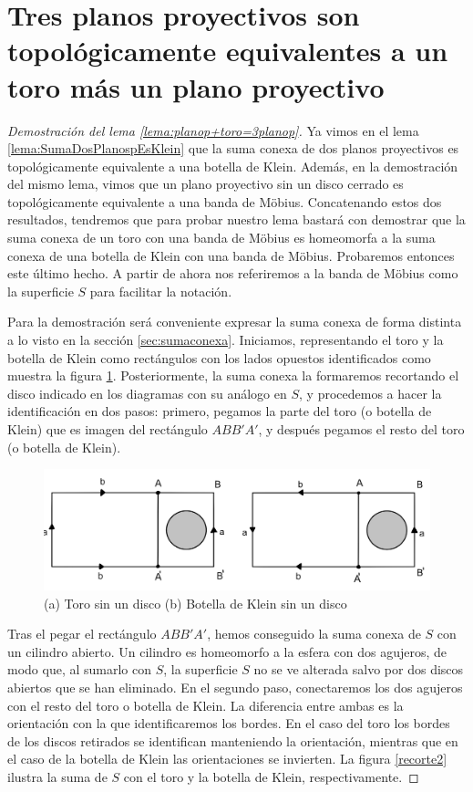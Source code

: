 \documentclass[a4paper,11pt,spanish, twoside, leqno]{tfg-uam}
\theoremstyle{definition}
\begin{document}
\section{Tres planos proyectivos son topológicamente equivalentes a un toro más un plano proyectivo}
\label{anexo:lema1}
\begin{proof}[Demostración del lema \ref{lema:planop+toro=3planop}]


Ya vimos en  el lema \ref{lema:SumaDosPlanospEsKlein} que la suma conexa de dos planos proyectivos es topológicamente equivalente a una botella de Klein. Además, en la demostración del mismo lema, vimos que un plano proyectivo sin un disco cerrado es topológicamente equivalente a una banda de M\"obius. Concatenando estos dos resultados, tendremos que para probar nuestro lema bastará con demostrar que la suma conexa de un toro con una banda de M\"obius es homeomorfa a la suma conexa de una botella de Klein con una banda de M\"obius. Probaremos entonces este último hecho. A partir de ahora nos referiremos a la banda de M\"obius como la superficie $S$ para facilitar la notación.

Para la demostración será conveniente expresar la suma conexa de forma distinta a lo visto en la sección \ref{sec:sumaconexa}. Iniciamos, representando el toro y la botella de Klein como rectángulos con los lados opuestos identificados como muestra la figura \ref{recorte1}. Posteriormente, la suma conexa la formaremos recortando el disco indicado en los diagramas  con su análogo en $S$, y procedemos a hacer la identificación en dos pasos: primero, pegamos la parte del toro (o botella de Klein) que es imagen del rectángulo $ABB'A'$, y después pegamos el resto del toro (o botella de Klein). 

\begin{figure}[h!]
	\centering
	\includegraphics[width=0.5\linewidth]{imagenes/recorte1.png}
	\caption{(a) Toro sin un disco    (b) Botella de Klein sin un disco}
    \label{recorte1}
\end{figure}

Tras el pegar el rectángulo $ABB'A'$, hemos conseguido la suma conexa de $S$ con un cilindro abierto.  Un cilindro es homeomorfo a la esfera con dos agujeros, de modo que, al sumarlo con $S$, la superficie $S$ no se ve alterada salvo por dos discos abiertos que se han eliminado. En el segundo paso, conectaremos los dos agujeros con el resto del toro o botella de Klein. La diferencia entre ambas es la orientación con la que identificaremos los bordes. En el caso del toro los bordes de los discos retirados se identifican manteniendo la orientación, mientras que en el caso de la botella de Klein las orientaciones se invierten. La figura \ref{recorte2} ilustra la suma de $S$ con el toro y la botella de Klein, respectivamente. 


\end{proof}
\end{document}
